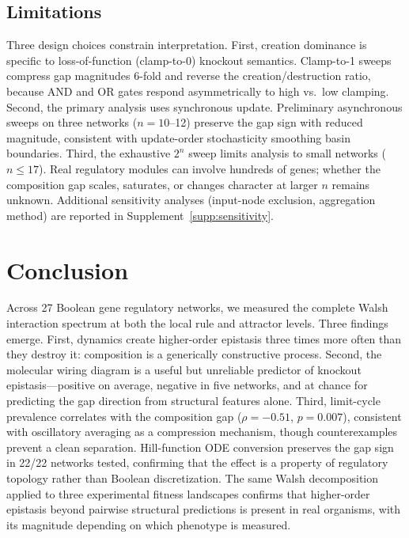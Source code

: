 \documentclass[10pt]{article}
\begin{document}
\subsection{Limitations}

Three design choices constrain interpretation.
First, creation dominance is specific to loss-of-function (clamp-to-0)
knockout semantics. Clamp-to-1 sweeps compress gap magnitudes 6-fold
and reverse the creation/destruction ratio, because AND and OR gates
respond asymmetrically to high vs.\ low clamping.
Second, the primary analysis uses synchronous update.
Preliminary asynchronous sweeps on three networks ($n = 10$--12)
preserve the gap sign with reduced magnitude, consistent with
update-order stochasticity smoothing basin boundaries.
Third, the exhaustive $2^n$ sweep limits analysis to small
networks ($n \leq 17$). Real regulatory modules can involve
hundreds of genes; whether the composition gap scales, saturates,
or changes character at larger $n$ remains unknown.
Additional sensitivity analyses (input-node exclusion,
aggregation method) are reported in
Supplement~\ref{supp:sensitivity}.


\section{Conclusion}
\label{sec:conclusion}

Across 27 Boolean gene regulatory networks, we measured the complete
Walsh interaction spectrum at both the local rule and attractor
levels. Three findings emerge. First, dynamics create higher-order
epistasis three times more often than they destroy it: composition
is a generically constructive process. Second, the molecular wiring
diagram is a useful but unreliable predictor of knockout
epistasis---positive on average, negative in five networks, and at
chance for predicting the gap direction from structural features
alone. Third, limit-cycle prevalence correlates with the composition
gap ($\rho = -0.51$, $p = 0.007$), consistent with oscillatory
averaging as a compression mechanism, though counterexamples prevent
a clean separation. Hill-function ODE conversion preserves the gap
sign in 22/22 networks tested, confirming that the effect is a
property of regulatory topology rather than Boolean discretization.
The same Walsh decomposition applied to three experimental fitness
landscapes confirms that higher-order epistasis beyond pairwise
structural predictions is present in real organisms, with its
magnitude depending on which phenotype is measured.
\end{document}
